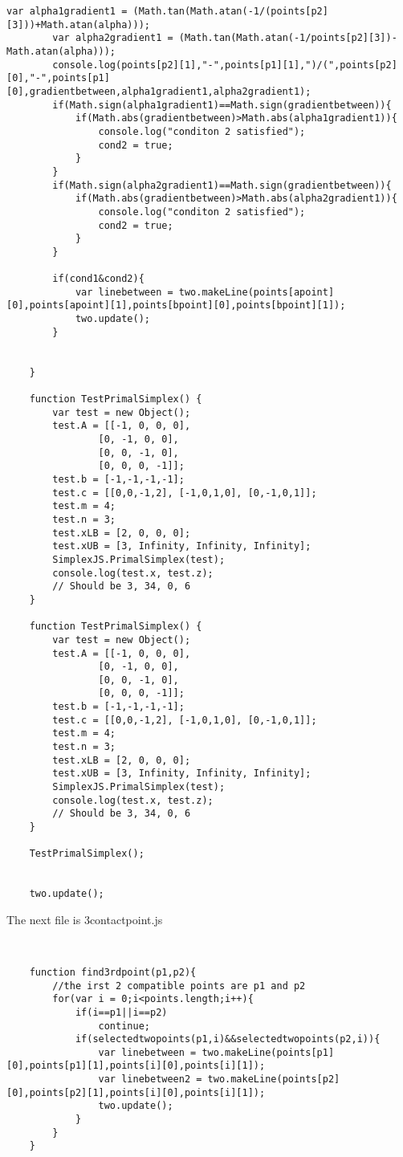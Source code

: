\documentclass[letterpaper, 10 pt, conference]{ieeeconf}
\begin{document}
\begin{lstlisting}[style=htmlcssjs]
        var alpha1gradient1 = (Math.tan(Math.atan(-1/(points[p2][3]))+Math.atan(alpha)));
        var alpha2gradient1 = (Math.tan(Math.atan(-1/points[p2][3])-Math.atan(alpha)));
        console.log(points[p2][1],"-",points[p1][1],")/(",points[p2][0],"-",points[p1][0],gradientbetween,alpha1gradient1,alpha2gradient1);
        if(Math.sign(alpha1gradient1)==Math.sign(gradientbetween)){
            if(Math.abs(gradientbetween)>Math.abs(alpha1gradient1)){
                console.log("conditon 2 satisfied");
                cond2 = true;
            }
        }
        if(Math.sign(alpha2gradient1)==Math.sign(gradientbetween)){
            if(Math.abs(gradientbetween)>Math.abs(alpha2gradient1)){
                console.log("conditon 2 satisfied");
                cond2 = true;
            }
        }
        
        if(cond1&cond2){
            var linebetween = two.makeLine(points[apoint][0],points[apoint][1],points[bpoint][0],points[bpoint][1]);
            two.update();
        }
    
        
    }
    
    function TestPrimalSimplex() {
        var test = new Object();
        test.A = [[-1, 0, 0, 0],
                [0, -1, 0, 0],
                [0, 0, -1, 0],
                [0, 0, 0, -1]];
        test.b = [-1,-1,-1,-1];
        test.c = [[0,0,-1,2], [-1,0,1,0], [0,-1,0,1]];
        test.m = 4;
        test.n = 3;
        test.xLB = [2, 0, 0, 0];
        test.xUB = [3, Infinity, Infinity, Infinity];
        SimplexJS.PrimalSimplex(test);
        console.log(test.x, test.z);
        // Should be 3, 34, 0, 6
    }
    
    function TestPrimalSimplex() {
        var test = new Object();
        test.A = [[-1, 0, 0, 0],
                [0, -1, 0, 0],
                [0, 0, -1, 0],
                [0, 0, 0, -1]];
        test.b = [-1,-1,-1,-1];
        test.c = [[0,0,-1,2], [-1,0,1,0], [0,-1,0,1]];
        test.m = 4;
        test.n = 3;
        test.xLB = [2, 0, 0, 0];
        test.xUB = [3, Infinity, Infinity, Infinity];
        SimplexJS.PrimalSimplex(test);
        console.log(test.x, test.z);
        // Should be 3, 34, 0, 6
    }
    
    TestPrimalSimplex();
    
    
    two.update();
    \end{lstlisting} 
    
    The next file is 3contactpoint.js
    
    \begin{lstlisting}[style=htmlcssjs]
    
    
    function find3rdpoint(p1,p2){
        //the irst 2 compatible points are p1 and p2
        for(var i = 0;i<points.length;i++){
            if(i==p1||i==p2)
                continue;
            if(selectedtwopoints(p1,i)&&selectedtwopoints(p2,i)){
                var linebetween = two.makeLine(points[p1][0],points[p1][1],points[i][0],points[i][1]);
                var linebetween2 = two.makeLine(points[p2][0],points[p2][1],points[i][0],points[i][1]);
                two.update();
            }
        }
    }
    
    
    \end{lstlisting}
    
    
\end{document}
